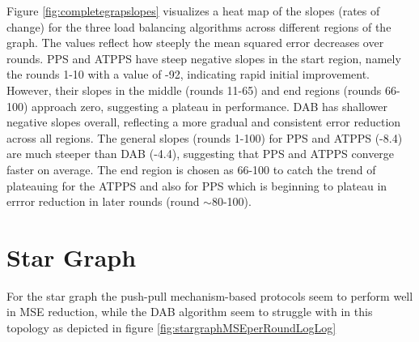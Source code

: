 
Figure \ref{fig:completegrapslopes} visualizes a heat map of the slopes (rates of change) for the three load balancing algorithms across different regions of the graph. The values reflect how steeply the mean squared error decreases over rounds. PPS and ATPPS have steep negative slopes in the start region, namely the rounds 1-10 with a value of -92, indicating rapid initial improvement. However, their slopes in the middle (rounds 11-65) and end regions (rounds 66-100) approach zero, suggesting a plateau in performance. DAB has shallower negative slopes overall, reflecting a more gradual and consistent error reduction across all regions. The general slopes (rounds 1-100) for PPS and ATPPS (-8.4) are much steeper than DAB (-4.4), suggesting that PPS and ATPPS converge faster on average. The end region is chosen as 66-100 to catch the trend of plateauing for the ATPPS and also for PPS which is beginning to plateau in errror reduction in later rounds (round $\sim$80-100).



\section{Star Graph}\label{sec:stargraph}
For the star graph the push-pull mechanism-based protocols seem to perform well in MSE reduction, while the DAB algorithm seem to struggle with in this topology as depicted in figure \ref{fig:stargraphMSEperRoundLogLog}


